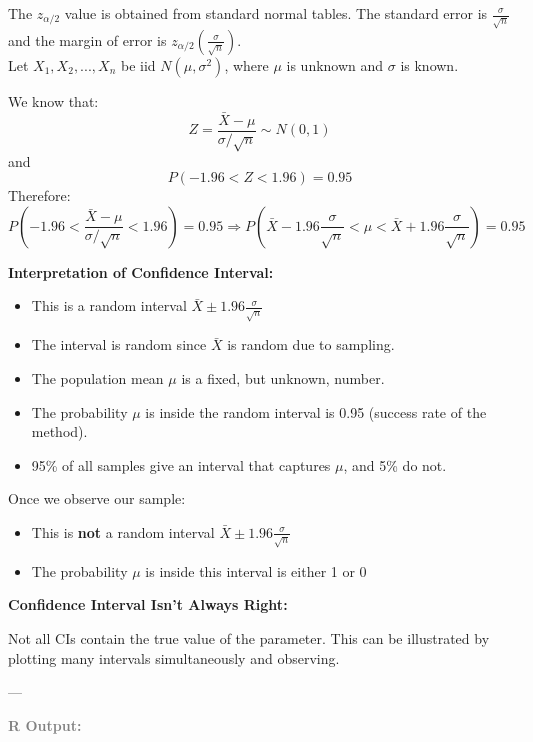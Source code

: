 The $z_{\alpha/2}$ value is obtained from standard normal tables. The standard error is $\frac{\sigma}{\sqrt{n}}$ and the margin of error is $z_{\alpha/2} \left( \frac{\sigma}{\sqrt{n}} \right)$.
\vspace{0.5em} \\
Let $X_1, X_2, ..., X_n$ be iid $N(\mu, \sigma^2)$, where $\mu$ is unknown and $\sigma$ is known.

We know that:
\[
Z = \frac{\bar{X} - \mu}{\sigma / \sqrt{n}} \sim N(0, 1)
\]
and
\[
P(-1.96 < Z < 1.96) = 0.95
\]
Therefore:
\[
P\left( -1.96 < \frac{\bar{X} - \mu}{\sigma / \sqrt{n}} < 1.96 \right) = 0.95
\Rightarrow P\left( \bar{X} - 1.96 \frac{\sigma}{\sqrt{n}} < \mu < \bar{X} + 1.96 \frac{\sigma}{\sqrt{n}} \right) = 0.95
\]

\vspace{1.5em}
\textbf{Interpretation of Confidence Interval:}

\begin{itemize}
  \item This is a random interval $\bar{X} \pm 1.96 \frac{\sigma}{\sqrt{n}}$
  \item The interval is random since $\bar{X}$ is random due to sampling.
  \item The population mean $\mu$ is a fixed, but unknown, number.
  \item The probability $\mu$ is inside the random interval is 0.95 (success rate of the method).
  \item 95\% of all samples give an interval that captures $\mu$, and 5\% do not.
\end{itemize}

\vspace{1em}
Once we observe our sample:

\begin{itemize}
  \item This is \textbf{not} a random interval $\bar{X} \pm 1.96 \frac{\sigma}{\sqrt{n}}$
  \item The probability $\mu$ is inside this interval is either 1 or 0
\end{itemize}

\vspace{1em}
\textbf{Confidence Interval Isn’t Always Right:}

Not all CIs contain the true value of the parameter. This can be illustrated by plotting many intervals simultaneously and observing.

---

\vspace{2em}
\textcolor{gray}{\textbf{R Output:}}

